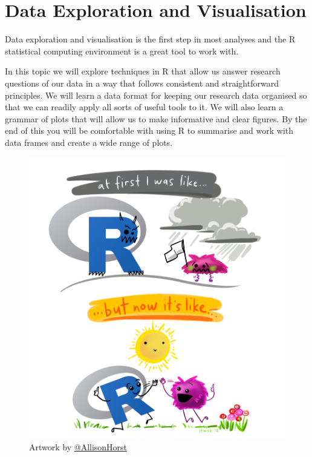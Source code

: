 \documentclass[
]{book}
\begin{document}
\hypertarget{data-exploration-and-visualisation}{%
\chapter{Data Exploration and Visualisation}\label{data-exploration-and-visualisation}}

Data exploration and visualisation is the first step in most analyses and the R statistical computing environment is a great tool to work with.

In this topic we will explore techniques in R that allow us answer research questions of our data in a way that follows consistent and straightforward principles. We will learn a data format for keeping our research data organised so that we can readily apply all sorts of useful tools to it. We will also learn a grammar of plots that will allow us to make informative and clear figures. By the end of this you will be comfortable with using R to summarise and work with data frames and create a wide range of plots.

\begin{figure}
\centering
\includegraphics{r_first_then.png}
\caption{\label{fig:unnamed-chunk-5}Artwork by \href{https://github.com/allisonhorst}{@AllisonHorst}}
\end{figure}
\end{document}
